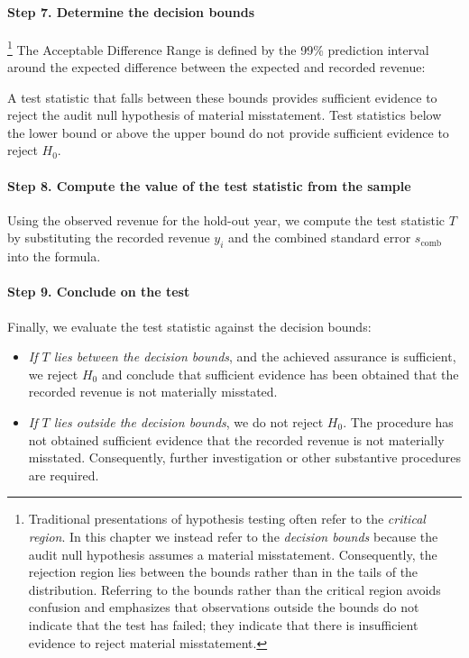 \paragraph{Step 7. Determine the decision bounds}\footnote{
Traditional presentations of hypothesis testing often refer to the \emph{critical region}. In this chapter we instead refer to the \emph{decision bounds} because the audit null hypothesis assumes a material misstatement. Consequently, the rejection region lies between the bounds rather than in the tails of the distribution. Referring to the bounds rather than the critical region avoids confusion and emphasizes that observations outside the bounds do not indicate that the test has failed; they indicate that there is insufficient evidence to reject material misstatement.}
\nopagebreak[4]
The Acceptable Difference Range is defined by the 99\% prediction interval around the expected difference between the expected and recorded revenue:



A test statistic that falls between these bounds provides sufficient evidence to reject the audit null hypothesis of material misstatement. Test statistics below the lower bound or above the upper bound do not provide sufficient evidence to reject $H_0$.

\paragraph{Step 8. Compute the value of the test statistic from the sample}
Using the observed revenue for the hold-out year, we compute the test statistic $T$ by substituting the recorded revenue $y_i$ and the combined standard error $s_{\text{comb}}$ into the formula.

\paragraph{Step 9. Conclude on the test}
Finally, we evaluate the test statistic against the decision bounds:
\begin{itemize}
    \item \emph{If $T$ lies between the decision bounds}, and the achieved assurance is sufficient, we reject $H_0$ and conclude that sufficient evidence has been obtained that the recorded revenue is not materially misstated.
    \item \emph{If $T$ lies outside the decision bounds}, we do not reject $H_0$. The procedure has not obtained sufficient evidence that the recorded revenue is not materially misstated. Consequently, further investigation or other substantive procedures are required.
\end{itemize}


